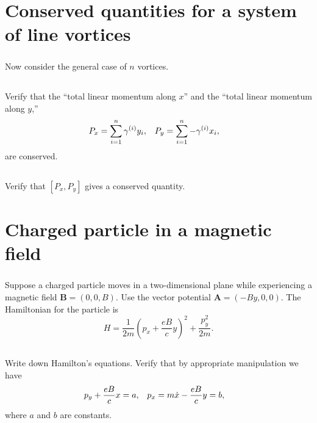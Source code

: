 \documentclass[11pt]{article}
\renewcommand{\vec}[1]{\mathbf{#1}}
\newcommand{\vfix}{\vspace{-\baselineskip}}
\newcommand{\beq}{\begin{equation*}}
\newcommand{\eeq}{\end{equation*}}
\newenvironment{statement}[1]
{
	\section{#1}
	\color{darkgray}
	\ignorespaces
}
{
}
\newenvironment{problem}
{
	\subsection{}
	\color{darkgray}
    \ignorespaces
}
{

}
\begin{document}











\newcommand{\Px}{P_x}
\newcommand{\Py}{P_y}

\begin{statement}{Conserved quantities for a system of line vortices} \label{vort2}
\subparagraph{}
	Now consider the general case of $n$ vortices.
\end{statement}

\begin{problem}
	Verify that the ``total linear momentum along $x$'' and the ``total linear momentum along $y$,''
	\begin{align*}
		\Px &= \sum_{i = 1}^n \gami \yi, &
		\Py &= \sum_{i = 1}^n -\gami \xi,
	\end{align*}
	are conserved.
\end{problem}

\begin{problem}
	Verify that $[\Px, \Py]$ gives a conserved quantity.
\end{problem}


\newcommand{\vB}{\vec{B}}
\newcommand{\vA}{\vec{A}}
\newcommand{\px}{p_x}
\newcommand{\py}{p_y}
\newcommand{\pdx}{\dot{p}_x}
\newcommand{\pdy}{\dot{p}_y}

\begin{statement}{Charged particle in a magnetic field}
\subparagraph{}
	Suppose a charged particle moves in a two-dimensional plane while experiencing a magnetic field $\vB = (0, 0, B)$.  Use the vector potential $\vA = (-By, 0, 0)$.  The Hamiltonian for the particle is
	\beq
		H = \frac{1}{2m} \left( \px + \frac{e B}{c} y \right)^2 + \frac{\py^2}{2m}.
	\eeq
\vfix
\end{statement}

\begin{problem}
	Write down Hamilton's equations.  Verify that by appropriate manipulation we have
	\begin{align*}
		\py + \frac{e B}{c} x &= a, &
		\px &= m \xd - \frac{e B}{c} y = b,
	\end{align*}
	where $a$ and $b$ are constants.
\end{problem}
\end{document}
